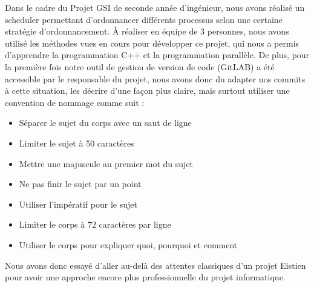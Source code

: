     Dans le cadre du Projet GSI de seconde année d'ingénieur, nous avons réalisé un scheduler permettant d'ordonnancer différents processus selon une certaine stratégie d’ordonnancement. À réaliser en équipe de 3 personnes, nous avons utilisé les méthodes vues en cours pour développer ce projet, qui nous a permis d'apprendre la programmation C++ et la programmation parallèle. De plus, pour la première fois notre outil de gestion de version de code (GitLAB) a été accessible par le responsable du projet, nous avons donc du adapter nos commits à cette situation, les décrire d'une façon plus claire, mais surtout utiliser une convention de nommage comme suit :
    
    \begin{itemize}
        \item Séparer le sujet du corps avec un saut de ligne
        \item Limiter le sujet à 50 caractères
        \item Mettre une majuscule au premier mot du sujet
        \item Ne pas finir le sujet par un point
        \item Utiliser l'impératif pour le sujet
        \item Limiter le corps à 72 caractères par ligne
        \item Utiliser le corps pour expliquer quoi, pourquoi et comment
    \end{itemize}
    
    Nous avons donc essayé d'aller au-delà des attentes classiques d'un projet Eistien pour avoir une approche encore plus professionnelle du projet informatique.